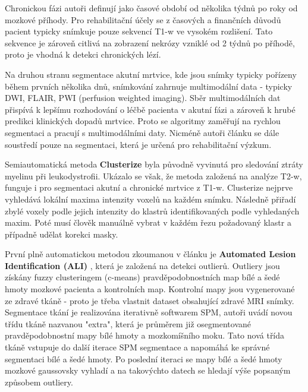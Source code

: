 \documentclass[11pt]{article}
\begin{document}
Chronickou fázi autoři definují jako časové období od několika týdnů po roky od mozkové příhody. Pro rehabilitační účely se z časových a finančních důvodů pacient typicky snímkuje pouze sekvencí T1-w ve vysokém rozlišení. Tato sekvence je zároveň citlivá na zobrazení nekrózy vzniklé od 2 týdnů po příhodě, proto je vhodná k detekci chronických lézí.

Na druhou stranu segmentace akutní mrtvice, kde jsou snímky typicky pořízeny během prvních několika dnů, snímkování zahrnuje multimodální data - typicky DWI, FLAIR, PWI (perfusion weighted imaging). Sběr multimodálních dat přispívá k lepšímu rozhodování o léčbě pacienta v akutní fázi a zároveň k hrubé predikci klinických dopadů mrtvice. Proto se algoritmy zaměřují na rychlou segmentaci a pracují s multimodálními daty. Nicméně autoři článku se dále soustředí pouze na segmentaci, která je určená pro rehabilitační výzkum.

Semiautomatická metoda \textbf{Clusterize} byla původně vyvinutá pro sledování ztráty myelinu při leukodystrofii. Ukázalo se však, že metoda založená na analýze T2-w, funguje i pro segmentaci akutní a chronické mrtvice z T1-w. \cite{DEHAAN201569} Clusterize nejprve vyhledává lokální maxima intenzity voxelů na každém snímku. Následně přiřadí zbylé voxely podle jejich intenzity do klastrů identifikovaných podle vyhledaných maxim. Poté musí člověk manuálně vybrat v každém řezu požadovaný klastr a případně udělat korekci masky.

První plně automatickou metodou zkoumanou v článku \cite{Ito2018} je \textbf{Automated Lesion Identification (ALI)} \cite{ali}, která je založená na detekci outlierů. Outliery jsou získány fuzzy clusteringem (c-means) pravděpodobnostních map bílé a šedé hmoty mozkové pacienta a kontrolních map. Kontrolní mapy jsou vygenerované ze zdravé tkáně - proto je třeba vlastnit dataset obsahující zdravé MRI snímky. Segmentace tkání je realizována iterativně softwarem \alert{SPM}, autoři uvádí novou třídu tkáně nazvanou "extra", která je průměrem již osegmentované pravděpodobnostní mapy bílé hmoty a mozkomíšního moku. Tato nová třída tkáně vstupuje do další iterace SPM segmentace a napomáhá ke správné segmentaci bílé a šedé hmoty. Po poslední iteraci se mapy bílé a šedé hmoty mozkové gaussovsky vyhladí a na takovýchto datech se hledají výše popsaným způsobem outliery.
\end{document}
